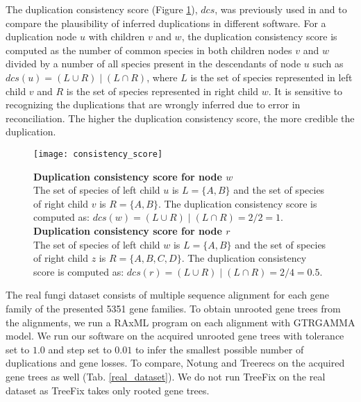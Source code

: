 The duplication consistency score (Figure \ref{consistency_score}), $dcs$, was previously used in \cite{treebest} and \cite{spimap} to compare the plausibility of inferred duplications in different software. For a duplication node $u$ with children $v$ and $w$, the duplication consistency score is computed as the number of common species in both children nodes $v$ and $w$ divided by a number of all species present in the descendants of node $u$ such as $dcs(u) = (L \cup R) \mid (L \cap R)$, where $L$ is the set of species represented in left child $v$ and $R$ is the set of species represented in right child $w$. It is sensitive to recognizing the duplications that are wrongly inferred due to error in reconciliation. The higher the duplication consistency score, the more credible the duplication.

\begin{figure}[ht!]
	\centering
	\label{consistency_score}
  	\texttt{[image: consistency\_score]}
  	\caption[Duplication consistency score]{\textbf{Duplication consistency score for node $w$}\\
  	The set of species of left child $u$ is $L = \{A, B\}$ and the set of species of right child $v$ is $R = \{A, B\}$. The duplication consistency score is computed as: $dcs(w) = (L \cup R) \mid (L \cap R) = 2 / 2 = 1$.
  	\\
  	\textbf{Duplication consistency score for node $r$}\\
  	The set of species of left child $w$ is $L = \{A, B\}$ and the set of species of right child $z$ is $R = \{A, B, C, D\}$. The duplication consistency score is computed as: $dcs(r) = (L \cup R) \mid (L \cap R) = 2 / 4 = 0.5$.}
\end{figure}

The real fungi dataset consists of multiple sequence alignment for each gene family of the presented 5351 gene families. To obtain unrooted gene trees from the alignments, we run a RAxML program on each alignment with GTRGAMMA model. We run our software on the acquired unrooted gene trees with tolerance set to $1.0$ and step set to $0.01$ to infer the smallest possible number of duplications and gene losses. To compare, Notung and Treerecs on the acquired gene trees as well (Tab. \ref{real_dataset}). We do not run TreeFix on the real dataset as TreeFix takes only rooted gene trees.

